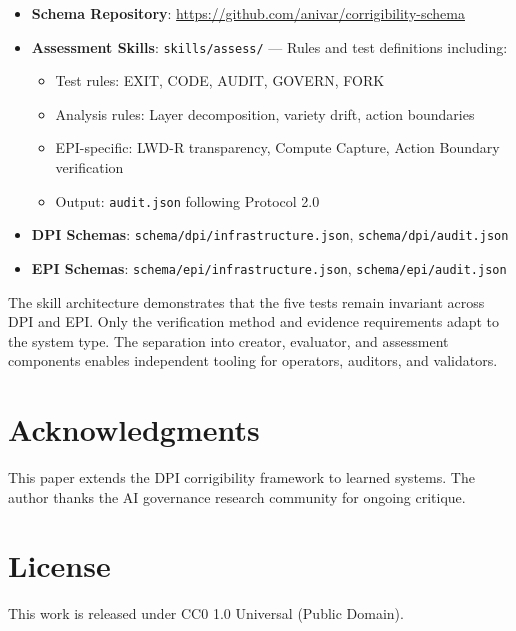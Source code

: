 \documentclass[11pt,a4paper]{article}
\theoremstyle{definition}
\begin{document}
\begin{itemize}
    \item \textbf{Schema Repository}: \url{https://github.com/anivar/corrigibility-schema}
    \item \textbf{Assessment Skills}: \texttt{skills/assess/} --- Rules and test definitions including:
    \begin{itemize}
        \item Test rules: EXIT, CODE, AUDIT, GOVERN, FORK
        \item Analysis rules: Layer decomposition, variety drift, action boundaries
        \item EPI-specific: LWD-R transparency, Compute Capture, Action Boundary verification
        \item Output: \texttt{audit.json} following Protocol 2.0
    \end{itemize}
    \item \textbf{DPI Schemas}: \texttt{schema/dpi/infrastructure.json}, \texttt{schema/dpi/audit.json}
    \item \textbf{EPI Schemas}: \texttt{schema/epi/infrastructure.json}, \texttt{schema/epi/audit.json}
\end{itemize}

The skill architecture demonstrates that the five tests remain invariant across DPI and EPI. Only the verification method and evidence requirements adapt to the system type. The separation into creator, evaluator, and assessment components enables independent tooling for operators, auditors, and validators.

\section*{Acknowledgments}

This paper extends the DPI corrigibility framework \citep{paper1} to learned systems. The author thanks the AI governance research community for ongoing critique.

\section*{License}

This work is released under CC0 1.0 Universal (Public Domain).

\end{document}
